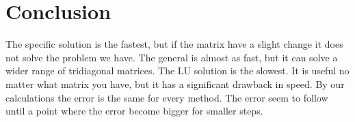 \documentclass[12pt,norsk,a4paper]{article}
\begin{document}
\section{Conclusion}
The specific solution is the fastest, but if the matrix have a slight change it does not solve the problem we have. The general is almost as fast, but it can solve a wider range of tridiagonal matrices. The LU solution is the slowest. It is useful no matter what matrix you have, but it has a significant drawback in speed. By our calculations the error is the same for every method. The error seem to follow until a point where the error become bigger for smaller steps. 



















\end{document}
